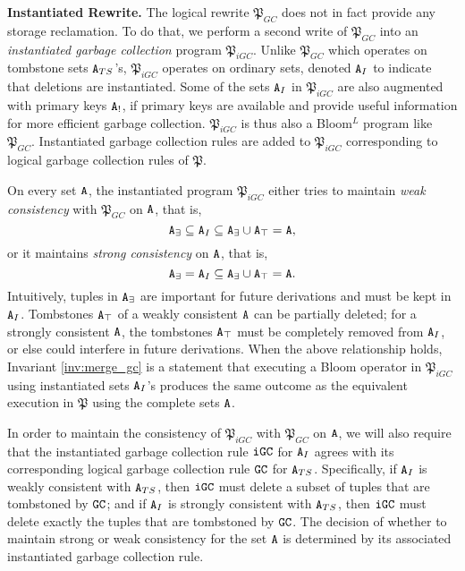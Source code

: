 \textbf{Instantiated Rewrite.}
The logical rewrite $\mathfrak{P}_{GC}$ does not in fact provide any storage reclamation.
To do that, we perform a second write of $\mathfrak{P}_{GC}$ into an \emph{instantiated garbage collection} program $\mathfrak{P}_{iGC}$.
Unlike $\mathfrak{P}_{GC}$ which operates on tombstone sets $\tt{A}_{TS}$'s, $\mathfrak{P}_{iGC}$ operates on ordinary sets, denoted $\tt{A}_I$ to indicate that deletions are instantiated.
Some of the sets $\tt{A}_I$ in $\mathfrak{P}_{iGC}$ are also augmented with primary keys $\tt{A}_!$, if primary keys are available and provide useful information for more efficient garbage collection.
$\mathfrak{P}_{iGC}$ is thus also a Bloom$^L$ program like $\mathfrak{P}_{GC}$.
Instantiated garbage collection rules are added to $\mathfrak{P}_{iGC}$ corresponding to logical garbage collection rules of $\mathfrak{P}$.

On every set $\tt{A}$, the instantiated program $\mathfrak{P}_{iGC}$ either tries to maintain \emph{weak consistency} with $\mathfrak{P}_{GC}$ on $\tt{A}$, that is,
\[ \tt{A}_\exists \subseteq \tt{A}_I \subseteq \tt{A}_\exists \cup \tt{A}_\top = \tt{A},\]
or it maintains \emph{strong consistency} on $\tt{A}$, that is,
\[ \tt{A}_\exists = \tt{A}_I \subseteq \tt{A}_\exists \cup \tt{A}_\top = \tt{A}.\]
Intuitively, tuples in $\tt{A}_\exists$ are important for future derivations and must be kept in $\tt{A}_I$.
Tombstones $\tt{A}_\top$ of a weakly consistent $\tt{A}$ can be partially deleted; for a strongly consistent $\tt{A}$, the tombstones $\tt{A}_\top$ must be completely removed from $\tt{A}_I$, or else could interfere in future derivations.
When the above relationship holds, Invariant \ref{inv:merge_gc} is a statement that executing a Bloom operator in $\mathfrak{P}_{iGC}$ using instantiated sets $\tt{A}_I$'s produces the same outcome as the equivalent execution in $\mathfrak{P}$ using the complete sets $\tt{A}$.

In order to maintain the consistency of $\mathfrak{P}_{iGC}$ with $\mathfrak{P}_{GC}$ on $\tt{A}$, we will also require that the instantiated garbage collection rule $\tt{iGC}$ for $\tt{A}_I$ agrees with its corresponding logical garbage collection rule $\tt{GC}$ for $\tt{A}_{TS}$.
Specifically, if $\tt{A}_I$ is weakly consistent with $\tt{A}_{TS}$, then $\tt{iGC}$ must delete a subset of tuples that are tombstoned by $\tt{GC}$; and if $\tt{A}_I$ is strongly consistent with $\tt{A}_{TS}$, then $\tt{iGC}$ must delete exactly the tuples that are tombstoned by $\tt{GC}$.
The decision of whether to maintain strong or weak consistency for the set $\tt{A}$ is determined by its associated instantiated garbage collection rule.


